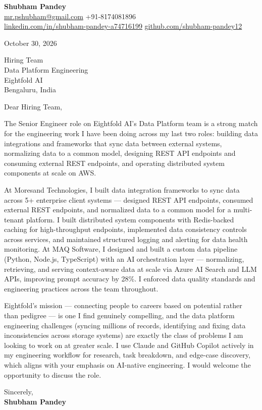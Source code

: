 \documentclass[a4paper,11pt]{article}
\begin{document}
\textbf{\Large Shubham Pandey}\\
\href{mailto:mr.pshubham@gmail.com}{mr.pshubham@gmail.com} \quad +91-8174081896\\
\href{https://www.linkedin.com/in/shubham-pandey-a74716199/}{linkedin.com/in/shubham-pandey-a74716199} \quad
\href{https://github.com/shubham-pandey12}{github.com/shubham-pandey12}

\vspace{1em}
October 30, 2026

\vspace{1em}
Hiring Team\\
Data Platform Engineering\\
Eightfold AI\\
Bengaluru, India

\vspace{1em}
Dear Hiring Team,

The Senior Engineer role on Eightfold AI's Data Platform team is a strong match for the engineering work I have been doing across my last two roles: building data integrations and frameworks that sync data between external systems, normalizing data to a common model, designing REST API endpoints and consuming external REST endpoints, and operating distributed system components at scale on AWS.

At Moresand Technologies, I built data integration frameworks to sync data across 5+ enterprise client systems --- designed REST API endpoints, consumed external REST endpoints, and normalized data to a common model for a multi-tenant platform. I built distributed system components with Redis-backed caching for high-throughput endpoints, implemented data consistency controls across services, and maintained structured logging and alerting for data health monitoring. At MAQ Software, I designed and built a custom data pipeline (Python, Node.js, TypeScript) with an AI orchestration layer --- normalizing, retrieving, and serving context-aware data at scale via Azure AI Search and LLM APIs, improving prompt accuracy by 28\%. I enforced data quality standards and engineering practices across the team throughout.

Eightfold's mission --- connecting people to careers based on potential rather than pedigree --- is one I find genuinely compelling, and the data platform engineering challenges (syncing millions of records, identifying and fixing data inconsistencies across storage systems) are exactly the class of problems I am looking to work on at greater scale. I use Claude and GitHub Copilot actively in my engineering workflow for research, task breakdown, and edge-case discovery, which aligns with your emphasis on AI-native engineering. I would welcome the opportunity to discuss the role.

\vspace{1em}
Sincerely,\\[0.5em]
\textbf{Shubham Pandey}
\end{document}
